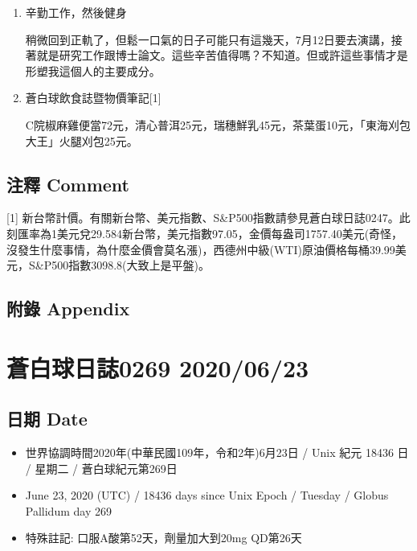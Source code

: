 \documentclass[a5paper, 11pt
]{book}
\providecommand{\tightlist}{%
  \setlength{\itemsep}{0pt}\setlength{\parskip}{0pt}}
\begin{document}
\begin{enumerate}
\def\labelenumi{\arabic{enumi}.}
\item
  辛勤工作，然後健身

  稍微回到正軌了，但鬆一口氣的日子可能只有這幾天，7月12日要去演講，接著就是研究工作跟博士論文。這些辛苦值得嗎？不知道。但或許這些事情才是形塑我這個人的主要成分。
\item
  蒼白球飲食誌暨物價筆記{[}1{]}

  C院椒麻雞便當72元，清心普洱25元，瑞穗鮮乳45元，茶葉蛋10元，「東海刈包大王」火腿刈包25元。
\end{enumerate}

\hypertarget{ux6ce8ux91cb-comment-19}{%
\subsection{注釋 Comment}\label{ux6ce8ux91cb-comment-19}}

{[}1{]}
新台幣計價。有關新台幣、美元指數、S\&P500指數請參見蒼白球日誌0247。此刻匯率為1美元兌29.584新台幣，美元指數97.05，金價每盎司1757.40美元(奇怪，沒發生什麼事情，為什麼金價會莫名漲)，西德州中級(WTI)原油價格每桶39.99美元，S\&P500指數3098.8(大致上是平盤)。

\hypertarget{ux9644ux9304-appendix-19}{%
\subsection{附錄 Appendix}\label{ux9644ux9304-appendix-19}}

\hypertarget{ux84bcux767dux7403ux65e5ux8a8c0269-20200623}{%
\section{蒼白球日誌0269
2020/06/23}\label{ux84bcux767dux7403ux65e5ux8a8c0269-20200623}}

\hypertarget{ux65e5ux671f-date-20}{%
\subsection{日期 Date}\label{ux65e5ux671f-date-20}}

\begin{itemize}
\tightlist
\item
  世界協調時間2020年(中華民國109年，令和2年)6月23日 / Unix 紀元 18436 日
  / 星期二 / 蒼白球紀元第269日
\item
  June 23, 2020 (UTC) / 18436 days since Unix Epoch / Tuesday / Globus
  Pallidum day 269
\item
  特殊註記: 口服A酸第52天，劑量加大到20mg QD第26天
\end{itemize}
\end{document}

